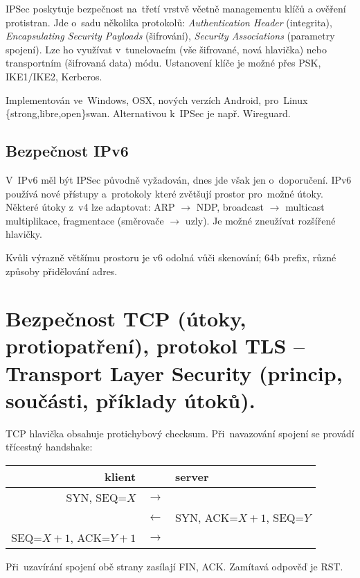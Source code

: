 IPSec poskytuje bezpečnost na~třetí vrstvě včetně managementu klíčů a ověření protistran.
Jde o~sadu několika protokolů: \emph{Authentication Header} (integrita), \emph{Encapsulating Security Payloads} (šifrování), \emph{Security Associations} (parametry spojení).
Lze ho využívat v~tunelovacím (vše šifrované, nová hlavička) nebo transportním (šifrovaná data) módu.
Ustanovení klíče je možné přes PSK, IKE1/IKE2, Kerberos.

Implementován ve~Windows, OSX, nových verzích Android, pro~Linux \{strong,libre,open\}swan.
Alternativou k~IPSec je např. Wireguard.


\subsection{Bezpečnost IPv6}

V~IPv6 měl být IPSec původně vyžadován, dnes jde však jen o~doporučení.
IPv6 používá nové přístupy a~protokoly které zvětšují prostor pro~možné útoky.
Některé útoky z~v4 lze adaptovat: ARP $\rightarrow$ NDP, broadcast $\rightarrow$ multicast multiplikace, fragmentace (směrovače $\rightarrow$ uzly).
Je možné zneužívat rozšířené hlavičky.

Kvůli výrazně většímu prostoru je v6 odolná vůči skenování; 64b prefix, různé způsoby přidělování adres.




\clearpage
\section{Bezpečnost TCP (útoky, protiopatření), protokol TLS -- Transport Layer Security (princip, součásti, příklady útoků).}

TCP hlavička obsahuje protichybový checksum.
Při~navazování spojení se provádí třícestný handshake:
\begin{center}
\begin{tabular}{rcl}
	klient & & server \\
	\hline
	SYN, SEQ=$X$ & $\rightarrow$ & \\
	& $\leftarrow$ & SYN, ACK=$X+1$, SEQ=$Y$ \\
	SEQ=$X+1$, ACK=$Y+1$ & $\rightarrow$ \\
\end{tabular}
\end{center}
Při~uzavírání spojení obě strany zasílají FIN, ACK.
Zamítavá odpověď je RST.



